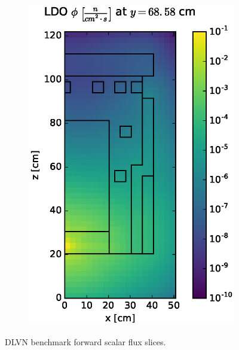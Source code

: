 \documentclass{article} %
\begin{document}
\begin{figure}[!htb]
\begin{subfigure}{0.4\textwidth}
\includegraphics[max height=0.445\textheight]
{img/dlvn-fwd-flux-ldo11.eps}
\end{subfigure}
\caption{DLVN benchmark forward scalar flux slices.}
\label{dlvn-fwd-slices}
\end{figure}
\end{document}
